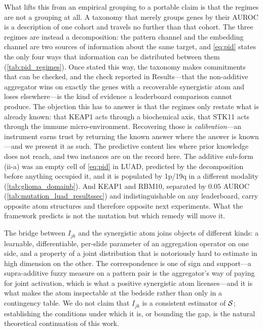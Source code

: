 What lifts this from an empirical grouping to a portable claim is
that the regimes are not a grouping at all.
A taxonomy that merely groups genes by their AUROC is a description
of one cohort and travels no further than that cohort.
The three regimes are instead a decomposition: the pattern channel
and the embedding channel are two sources of information about the
same target, and \cref{eq:pid} states the only four ways that
information can be distributed between them
(\cref{tab:pid_regimes}).\cite{williams2010pid,bertschinger2014unique}
Once stated this way, the taxonomy makes commitments that can be
checked, and the check reported in Results---that the non-additive
aggregator wins on exactly the genes with a recoverable synergistic
atom and loses elsewhere---is the kind of evidence a leaderboard
comparison cannot produce.
The objection this has to answer is that the regimes only restate what
is already known: that KEAP1 acts through a biochemical axis, that
STK11 acts through the immune micro-environment. Recovering those is
\emph{calibration}---an instrument earns trust by returning the known
answer where the answer is known---and we present it as such. The
predictive content lies where prior knowledge does not reach, and two
instances are on the record here. The additive sub-form (ii-a) was an
empty cell of \cref{eq:pid} in LUAD, predicted by the decomposition
before anything occupied it, and it is populated by 1p/19q in a
different modality (\cref{tab:glioma_domainb}). And KEAP1 and RBM10,
separated by $0.05$ AUROC (\cref{tab:mutation_luad_resultssec}) and
indistinguishable on any leaderboard, carry opposite atom structures and
therefore opposite next experiments. What the framework predicts is not
the mutation but which remedy will move it.

The bridge between $I_{jk}$ and the synergistic atom joins objects of
different kinds: a learnable, differentiable, per-slide parameter of an
aggregation operator on one side, and a property of a joint distribution
that is notoriously hard to estimate in high dimension on the other. The
correspondence is one of sign and support---a supra-additive fuzzy measure
on a pattern pair is the aggregator's way of paying for joint activation,
which is what a positive synergistic atom licenses---and it is what makes
the atom inspectable at the bedside rather than only in a contingency table.
We do not claim that $I_{jk}$ is a consistent estimator of
$\mathcal{S}$; establishing the conditions under which it is, or bounding
the gap, is the natural theoretical continuation of this work.

